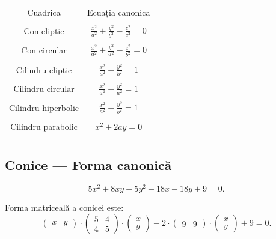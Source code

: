 \documentclass[11pt,a4paper]{article}
\theoremstyle{dotless}
\theoremstyle{dotlessdr}
\begin{document}
\begin{center}
  \begin{tabular}{| c | c |}
    \hline
    Cuadrica & Ecuația canonică \\ & \\
    \hline
    Con eliptic & $\frac{x^2}{a^2} + \frac{y^2}{b^2} - \frac{z^2}{c^2} = 0$ \\ & \\
    Con circular & $\frac{x^2}{a^2} + \frac{y^2}{a^2} - \frac{z^2}{b^2} = 0$ \\ & \\
    Cilindru eliptic & $\frac{x^2}{a^2} + \frac{y^2}{b^2} = 1$ \\ & \\
    Cilindru circular & $\frac{x^2}{a^2} + \frac{y^2}{a^2} = 1$ \\ & \\
    Cilindru hiperbolic & $\frac{x^2}{a^2} - \frac{y^2}{b^2} = 1$ \\ & \\
    Cilindru parabolic & $x^2 + 2ay = 0$ \\ & \\
    \hline
  \end{tabular}
\end{center}



\subsection{Conice --- Forma canonică}
\label{sec:conice-canonica}

\[
  5x^2 + 8xy + 5y^2 - 18x - 18y + 9 = 0.
\]

Forma matriceală a conicei este:
\[
  \begin{pmatrix}
    x & y
  \end{pmatrix} \cdot
  \begin{pmatrix}
    5 & 4 \\
    4 & 5 
  \end{pmatrix} \cdot
  \begin{pmatrix}
    x \\ y
  \end{pmatrix} - 2 \cdot
  \begin{pmatrix}
    9 & 9
  \end{pmatrix} \cdot
  \begin{pmatrix}
    x \\ y
  \end{pmatrix} + 9 = 0.
\]
\end{document}
